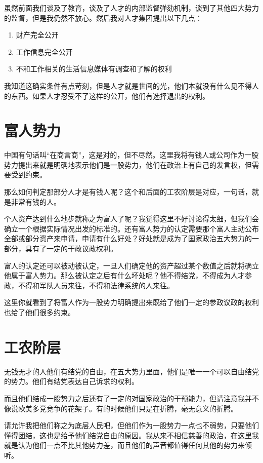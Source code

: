 \documentclass[11pt,oneside]{article}
\begin{document}
虽然前面我们谈及了教育，谈及了人才的内部监督弹劾机制，谈到了其他四大势力的监督，但是我仍然不放心。然后我对人才集团提出以下几点：

\begin{enumerate}
\item 财产完全公开
\item 工作信息完全公开
\item 不和工作相关的生活信息媒体有调查和了解的权利
\end{enumerate}


我知道这确实条件有点苛刻，但是人才就是世间的光，他们本就没有什么见不得人的东西。如果人才忍受不了这样的公开，他们有选择退出的权利。


\section{富人势力}
\label{sec-4}
中国有句话叫“在商言商”，这是对的，但不尽然。这里我将有钱人或公司作为一股势力提出来就是明确地表示他们是一股势力，他们在政治上有自己的发言权，但需要受到约束。

那么如何判定那部分人才是有钱人呢？这个和后面的工农阶层是对应，一句话，就是非常有钱的人。

个人资产达到什么地步就称之为富人了呢？我觉得这里不好讨论得太细，但我们会确立一个根据实际情况出发的标准的。还有富人势力的认定需要那个富人主动公布全部或部分资产来申请，申请有什么好处？好处就是成为了国家政治五大势力的一部分，具有了一定的干政议政权利。

富人的认定还可以被动被认定，一旦人们确定他的资产超过某个数值之后就将确立他属于富人势力。那么被认定之后有什么坏处呢？他不得结党，不得成为人才参政，不得和军队人员来往，不得和法律系统的人来往。

这里你就看到了将富人作为一股势力明确提出来既给了他们一定的参政议政的权利也给了他们很多约束。


\section{工农阶层}
\label{sec-5}
无钱无才的人他们有结党的自由，在五大势力里面，他们是唯一一个可以自由结党的势力。他们有结党表达自己诉求的权利。

而且他们结成一股势力之后还有了一定的对国家政治的干预能力，但请注意我并不像说欧美多党竞争的花架子。有的时候他们只是在折腾，毫无意义的折腾。

请允许我把他们称之为底层人民吧，但他们作为一股势力一点也不弱势，只要他们懂得团结，这也是给予他们结党自由的原因。我从来不相信慈善的政治，在这里我就是认为他们一点不比其他势力差，而且他们的声音都值得任何其他的势力来倾听。
\end{document}
